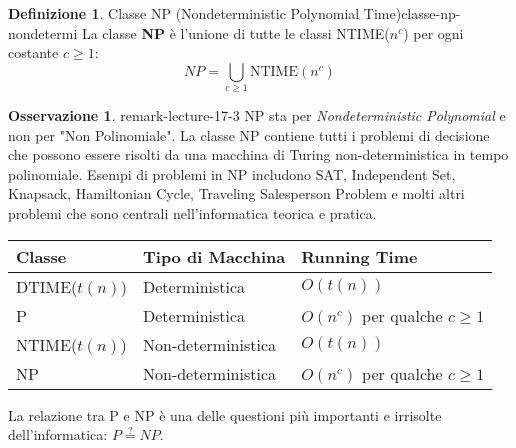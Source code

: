 \documentclass[a4paper]{article}
\theoremstyle{definition} %
\newtheorem{definition}{Definizione}[section]
\newtheorem{remark}[theorem]{Osservazione}
\begin{document}
\begin{definition}{Classe NP (Nondeterministic Polynomial Time)}{classe-np-nondetermi}
La classe \textbf{NP} è l'unione di tutte le classi NTIME($n^c$) per ogni costante $c \ge 1$:
\[ NP = \bigcup_{c \ge 1} \text{NTIME}(n^c) \]
\end{definition}

\begin{remark}{}{{ remark-lecture-17-3 }}
NP sta per \emph{Nondeterministic Polynomial} e non per "Non Polinomiale". La classe NP contiene tutti i problemi di decisione che possono essere risolti da una macchina di Turing non-deterministica in tempo polinomiale.
Esempi di problemi in NP includono SAT, Independent Set, Knapsack, Hamiltonian Cycle, Traveling Salesperson Problem e molti altri problemi che sono centrali nell'informatica teorica e pratica.
\end{remark}

\begin{center}
\begin{tabular}{|l|l|l|}
\hline
\textbf{Classe} & \textbf{Tipo di Macchina} & \textbf{Running Time} \\
\hline
DTIME($t(n)$) & Deterministica & $O(t(n))$ \\
P & Deterministica & $O(n^c)$ per qualche $c \ge 1$ \\
NTIME($t(n)$) & Non-deterministica & $O(t(n))$ \\
NP & Non-deterministica & $O(n^c)$ per qualche $c \ge 1$ \\
\hline
\end{tabular}
\end{center}

La relazione tra P e NP è una delle questioni più importanti e irrisolte dell'informatica: $P \stackrel{?}{=} NP$.
\end{document}
